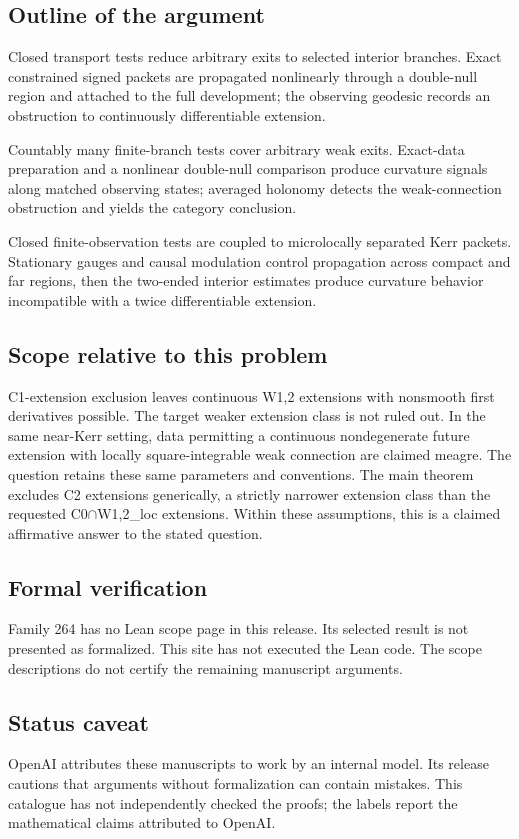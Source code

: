 \documentclass[11pt]{article}
\begin{document}
\subsection{Outline of the argument}
Closed transport tests reduce arbitrary exits to selected interior branches. Exact constrained signed packets are propagated nonlinearly through a double-null region and attached to the full development; the observing geodesic records an obstruction to continuously differentiable extension.

Countably many finite-branch tests cover arbitrary weak exits. Exact-data preparation and a nonlinear double-null comparison produce curvature signals along matched observing states; averaged holonomy detects the weak-connection obstruction and yields the category conclusion.

Closed finite-observation tests are coupled to microlocally separated Kerr packets. Stationary gauges and causal modulation control propagation across compact and far regions, then the two-ended interior estimates produce curvature behavior incompatible with a twice differentiable extension.

\subsection{Scope relative to this problem}
C1-extension exclusion leaves continuous W1,2 extensions with nonsmooth first derivatives possible. The target weaker extension class is not ruled out. In the same near-Kerr setting, data permitting a continuous nondegenerate future extension with locally square-integrable weak connection are claimed meagre. The question retains these same parameters and conventions. The main theorem excludes C2 extensions generically, a strictly narrower extension class than the requested C0\(\cap\)W1,2\_loc extensions. Within these assumptions, this is a claimed affirmative answer to the stated question.

\subsection{Formal verification}
Family 264 has no Lean scope page in this release. Its selected result is not presented as formalized. This site has not executed the Lean code. The scope descriptions do not certify the remaining manuscript arguments.

\subsection{Status caveat}
OpenAI attributes these manuscripts to work by an internal model. Its release cautions that arguments without formalization can contain mistakes. This catalogue has not independently checked the proofs; the labels report the mathematical claims attributed to OpenAI.
\end{document}
